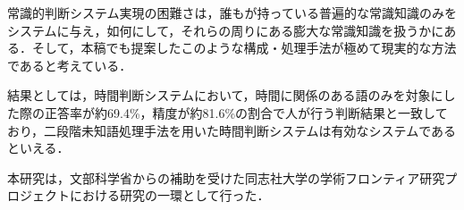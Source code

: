 常識的判断システム実現の困難さは，誰もが持っている普遍的な常識知識のみをシステムに与え，如何にして，それらの周りにある膨大な常識知識を扱うかにある．そして，本稿でも提案したこのような構成・処理手法が極めて現実的な方法であると考えている．

結果としては，時間判断システムにおいて，時間に関係のある語のみを対象にした際の正答率が約69.4\%，精度が約81.6\%の割合で人が行う判断結果と一致しており，二段階未知語処理手法を用いた時間判断システムは有効なシステムであるといえる．



\acknowledgment

本研究は，文部科学省からの補助を受けた同志社大学の学術フロンティア研究プロジェクトにおける研究の一環として行った．





